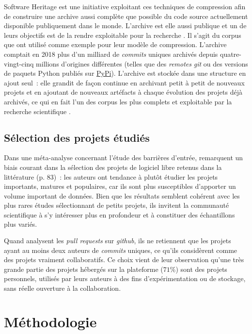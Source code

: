 \documentclass[dvipsnames,runningheads]{llncs}
\newcommand{\en}[1]{\foreignlanguage{english}{\emph{#1}}}
\begin{document}
    Software Heritage est une initiative exploitant ces techniques de compression afin de construire une
    archive aussi complète que possible du code source actuellement disponible publiquement dans le monde.
    L'archive est elle aussi publique et un de leurs objectifs est de la rendre exploitable pour la recherche
    \parencite{swh-2017}. Il s'agit du corpus que \textcite{swh-graph-2020} ont utilisé comme exemple pour
    leur modèle de compression. L'archive comptait en 2018 plus d'un milliard de \en{commits} uniques archivés
    depuis quatre-vingt-cinq millions d'origines différentes (telles que des \en{remotes} \en{git} ou des
    versions de paquets Python publiés sur \href{https://pypi.org/}{PyPi}). L'archive est stockée dans une
    structure en ajout seul : elle grandit de façon continue en archivant petit à petit de nouveaux projets
    et en ajoutant de nouveaux artéfacts à chaque évolution des projets déjà archivés, ce qui en fait l'un des
    corpus les plus complets et exploitable par la recherche scientifique
    \parencite{swh-2019,swh-growth-2019}.

    \subsection{Sélection des projets étudiés}

    Dans une méta-analyse concernant l'étude des barrières d'entrée, \textcite{barriers-meta-2015} remarquent
    un biais courant dans la sélection des projets de logiciel libre retenus dans la littérature (p. 83) : les
    auteurs ont tendance à plutôt étudier les projets importants, matures et populaires, car ils sont plus
    susceptibles d'apporter un volume important de données. Bien que les résultats semblent cohérent avec les
    plus rares études sélectionnant de petits projets, ils invitent la communauté scientifique à s'y
    intéresser plus en profondeur et à constituer des échantillons plus variés.

    Quand \textcite{mining-github-2014} analysent les \en{pull requests} sur \en{github}, ils ne retiennent
    que les projets ayant au moins deux auteurs de \en{commits} uniques, ce qu'ils considèrent comme des
    projets vraiment collaboratifs. Ce choix vient de leur observation qu'une très grande partie des projets
    hébergés sur la plateforme ($71\%$) sont des projets personnels, utilisés par leurs auteurs à des fins
    d'expérimentation ou de stockage, sans réelle ouverture à la collaboration.

    \section{Méthodologie}
\end{document}
